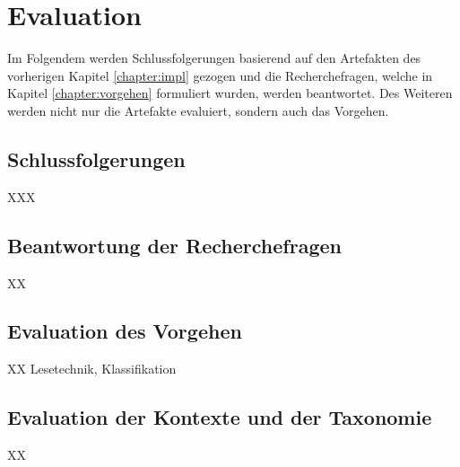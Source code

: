 \chapter{Evaluation}
\label{chapter:evaluation}
Im Folgendem werden Schlussfolgerungen basierend auf den Artefakten des vorherigen Kapitel \ref{chapter:impl} gezogen und die Recherchefragen, welche in Kapitel \ref{chapter:vorgehen} formuliert wurden, werden beantwortet. Des Weiteren werden nicht nur die Artefakte evaluiert, sondern auch das Vorgehen. \\

\section{Schlussfolgerungen}
XXX

\section{Beantwortung der Recherchefragen}
XX

\section{Evaluation des Vorgehen}
XX Lesetechnik, Klassifikation

\section{Evaluation der Kontexte und der Taxonomie}
XX


